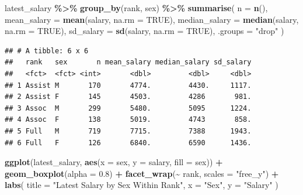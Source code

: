\documentclass[
]{article}
\newenvironment{Shaded}{\begin{snugshade}}{\end{snugshade}}
\newcommand{\AttributeTok}[1]{\textcolor[rgb]{0.13,0.29,0.53}{#1}}
\newcommand{\ConstantTok}[1]{\textcolor[rgb]{0.56,0.35,0.01}{#1}}
\newcommand{\FloatTok}[1]{\textcolor[rgb]{0.00,0.00,0.81}{#1}}
\newcommand{\FunctionTok}[1]{\textcolor[rgb]{0.13,0.29,0.53}{\textbf{#1}}}
\newcommand{\NormalTok}[1]{#1}
\newcommand{\SpecialCharTok}[1]{\textcolor[rgb]{0.81,0.36,0.00}{\textbf{#1}}}
\newcommand{\StringTok}[1]{\textcolor[rgb]{0.31,0.60,0.02}{#1}}
\begin{document}
\begin{Shaded}
\begin{Highlighting}[]
\NormalTok{latest\_salary }\SpecialCharTok{\%\textgreater{}\%}
  \FunctionTok{group\_by}\NormalTok{(rank, sex) }\SpecialCharTok{\%\textgreater{}\%}
  \FunctionTok{summarise}\NormalTok{(}
    \AttributeTok{n =} \FunctionTok{n}\NormalTok{(),}
    \AttributeTok{mean\_salary =} \FunctionTok{mean}\NormalTok{(salary, }\AttributeTok{na.rm =} \ConstantTok{TRUE}\NormalTok{),}
    \AttributeTok{median\_salary =} \FunctionTok{median}\NormalTok{(salary, }\AttributeTok{na.rm =} \ConstantTok{TRUE}\NormalTok{),}
    \AttributeTok{sd\_salary =} \FunctionTok{sd}\NormalTok{(salary, }\AttributeTok{na.rm =} \ConstantTok{TRUE}\NormalTok{),}
    \AttributeTok{.groups =} \StringTok{"drop"}
\NormalTok{  )}
\end{Highlighting}
\end{Shaded}

\begin{verbatim}
## # A tibble: 6 x 6
##   rank   sex       n mean_salary median_salary sd_salary
##   <fct>  <fct> <int>       <dbl>         <dbl>     <dbl>
## 1 Assist M       170       4774.         4430.     1117.
## 2 Assist F       145       4503.         4286       981.
## 3 Assoc  M       299       5480.         5095      1224.
## 4 Assoc  F       138       5019.         4743       858.
## 5 Full   M       719       7715.         7388      1943.
## 6 Full   F       126       6840.         6590      1436.
\end{verbatim}

\begin{Shaded}
\begin{Highlighting}[]
\FunctionTok{ggplot}\NormalTok{(latest\_salary, }\FunctionTok{aes}\NormalTok{(}\AttributeTok{x =}\NormalTok{ sex, }\AttributeTok{y =}\NormalTok{ salary, }\AttributeTok{fill =}\NormalTok{ sex)) }\SpecialCharTok{+}
  \FunctionTok{geom\_boxplot}\NormalTok{(}\AttributeTok{alpha =} \FloatTok{0.8}\NormalTok{) }\SpecialCharTok{+}
  \FunctionTok{facet\_wrap}\NormalTok{(}\SpecialCharTok{\textasciitilde{}}\NormalTok{ rank, }\AttributeTok{scales =} \StringTok{"free\_y"}\NormalTok{) }\SpecialCharTok{+}
  \FunctionTok{labs}\NormalTok{(}
    \AttributeTok{title =} \StringTok{"Latest Salary by Sex Within Rank"}\NormalTok{,}
    \AttributeTok{x =} \StringTok{"Sex"}\NormalTok{,}
    \AttributeTok{y =} \StringTok{"Salary"}
\NormalTok{  )}
\end{Highlighting}
\end{Shaded}
\end{document}

